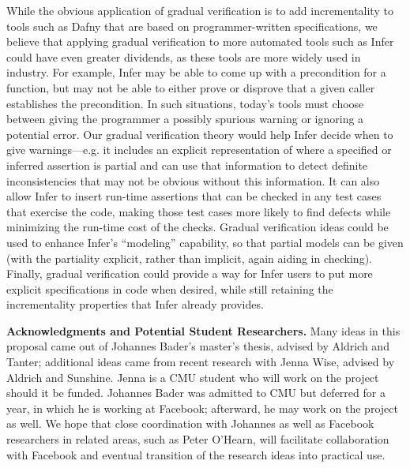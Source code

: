 \documentclass[10pt,twocolumn]{article}
\newcommand{\minisec}[1]{\vspace{2ex}\noindent\textbf{#1}}
\begin{document}
\begin{sloppypar}
While the obvious application of gradual verification is to add incrementality to tools such as Dafny that are based on programmer-written specifications, we believe that applying gradual verification to more automated tools such as Infer could have even greater dividends, as these tools are more widely used in industry.  For example, Infer may be able to come up with a precondition for a function, but may not be able to either prove or disprove that a given caller establishes the precondition.  In such situations, today's tools must choose between giving the programmer a possibly spurious warning or ignoring a potential error.  Our gradual verification theory would help Infer decide when to give warnings---e.g. it includes an explicit representation of where a specified or inferred assertion is partial and can use that information to detect definite inconsistencies that may not be obvious without this information.  It can also allow Infer to insert run-time assertions that can be checked in any test cases that exercise the code, making those test cases more likely to find defects while minimizing the run-time cost of the checks.  Gradual verification ideas could be used to enhance Infer's ``modeling'' capability, so that partial models can be given (with the partiality explicit, rather than implicit, again aiding in checking).  Finally, gradual verification could provide a way for Infer users to put more explicit specifications in code when desired, while still retaining the incrementality properties that Infer already provides.


\minisec{Acknowledgments and Potential Student Researchers.}  Many ideas in this proposal came out of Johannes Bader's master's thesis, advised by Aldrich and Tanter; additional ideas came from recent research with Jenna Wise, advised by Aldrich and Sunshine.  Jenna is a CMU student who will work on the project should it be funded.  Johannes Bader was admitted to CMU but deferred for a year, in which he is working at Facebook; afterward, he may work on the project as well.  We hope that close coordination with Johannes as well as Facebook researchers in related areas, such as Peter O'Hearn, will facilitate collaboration with Facebook and eventual transition of the research ideas into practical use.




\end{sloppypar}
\end{document}
